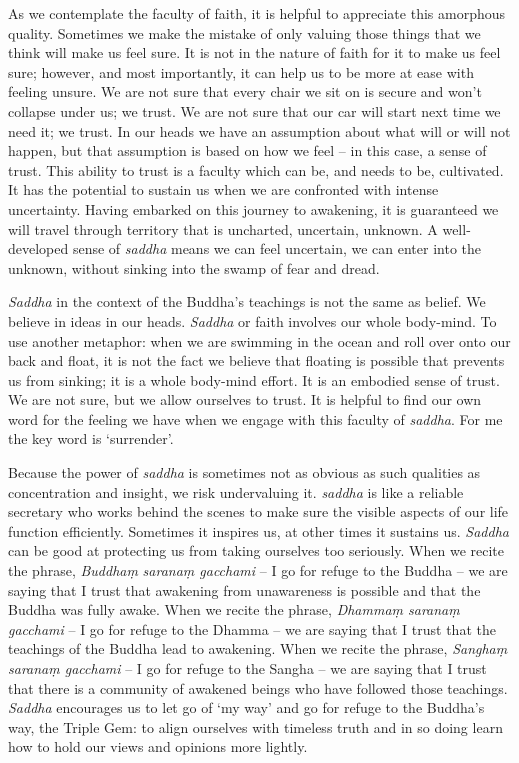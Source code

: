 As we contemplate the faculty of faith, it is helpful to appreciate this
amorphous quality. Sometimes we make the mistake of only valuing those
things that we think will make us feel sure. It is not in the nature of
faith for it to make us feel sure; however, and most importantly, it can
help us to be more at ease with feeling unsure. We are not sure that
every chair we sit on is secure and won't collapse under us; we trust.
We are not sure that our car will start next time we need it; we trust.
In our heads we have an assumption about what will or will not happen,
but that assumption is based on how we feel -- in this case, a sense of
trust. This ability to trust is a faculty which can be, and needs to be,
cultivated. It has the potential to sustain us when we are confronted
with intense uncertainty. Having embarked on this journey to awakening,
it is guaranteed we will travel through territory that is uncharted,
uncertain, unknown. A well-developed sense of \emph{saddha} means we can
feel uncertain, we can enter into the unknown, without sinking into the
swamp of fear and dread.

\emph{Saddha} in the context of the Buddha's teachings is not the same
as belief. We believe in ideas in our heads. \emph{Saddha} or faith
involves our whole body-mind. To use another metaphor: when we are
swimming in the ocean and roll over onto our back and float, it is not
the fact we believe that floating is possible that prevents us from
sinking; it is a whole body-mind effort. It is an embodied sense of
trust. We are not sure, but we allow ourselves to trust. It is helpful
to find our own word for the feeling we have when we engage with this
faculty of \emph{saddha}. For me the key word is `surrender'.

Because the power of \emph{saddha} is sometimes not as obvious as such
qualities as concentration and insight, we risk undervaluing it.
\emph{saddha} is like a reliable secretary who works behind the scenes
to make sure the visible aspects of our life function efficiently.
Sometimes it inspires us, at other times it sustains us. \emph{Saddha}
can be good at protecting us from taking ourselves too seriously. When
we recite the phrase, \emph{Buddhaṃ} \emph{saranaṃ gacchami} -- I go for
refuge to the Buddha -- we are saying that I trust that awakening from
unawareness is possible and that the Buddha was fully awake. When we
recite the phrase, \emph{Dhammaṃ saranaṃ gacchami} -- I go for refuge to
the Dhamma -- we are saying that I trust that the teachings of the
Buddha lead to awakening. When we recite the phrase, \emph{Sanghaṃ
saranaṃ gacchami} -- I go for refuge to the Sangha -- we are saying that
I trust that there is a community of awakened beings who have followed
those teachings. \emph{Saddha} encourages us to let go of `my way' and
go for refuge to the Buddha's way, the Triple Gem: to align ourselves
with timeless truth and in so doing learn how to hold our views and
opinions more lightly.


